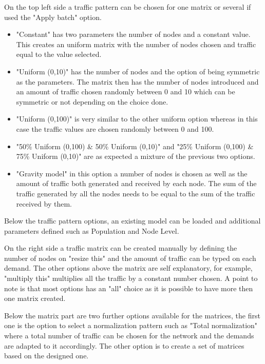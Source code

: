 	\vspace{-0.3cm}
	
	On the top left side a traffic pattern can be chosen for one matrix or several if used the "Apply batch" option.
	
	\begin{itemize}	
		
		\item{"Constant" has two parameters the number of nodes and a constant value. This creates an uniform matrix with the number of nodes chosen and traffic equal to the value selected.}
	
		\item{"Uniform (0,10)" has the number of nodes and the option of being symmetric as the parameters. The matrix then has the number of nodes introduced and an amount of traffic chosen randomly between 0 and 10 which can be symmetric or not depending on the choice done.}
	
		\item{"Uniform (0,100)" is very similar to the other uniform option whereas in this case the traffic values are chosen randomly between 0 and 100.}
	
		\item{"50\% Uniform (0,100) \& 50\% Uniform (0,10)" and "25\% Uniform (0,100) \& 75\% Uniform (0,10)" are as expected a mixture of the previous two options.}
	
		\item{"Gravity model" in this option a number of nodes is chosen as well as the amount of traffic both generated and received by each node. The sum of the traffic generated by all the nodes needs to be equal to the sum of the traffic received by them. }

	\end{itemize}
	
	Below the traffic pattern options, an existing model can be loaded and additional parameters defined such as Population and Node Level.
	
	On the right side a traffic matrix can be created manually by defining the number of nodes on "resize this" and the amount of traffic can be typed on each demand. The other options above the matrix are self explanatory, for example, "multiply this" multiplies all the traffic by a constant number chosen. A point to note is that most options has an "all" choice as it is possible to have more then one matrix created.
	
	Below the matrix part are two further options available for the matrices, the first one is the option to select a normalization pattern such as "Total normalization" where a total number of traffic can be chosen for the network and the demands are adapted to it accordingly. The other option is to create a set of matrices based on the designed one.\\
	
